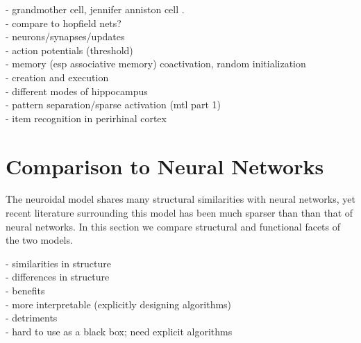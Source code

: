 \documentclass[letterpaper, 12pt]{article}
\begin{document}
- grandmother cell,  jennifer anniston cell \cite{quiroga_invariant_2005}.\\
- compare to hopfield nets?\\
- neurons/synapses/updates\\
- action potentials (threshold)\\
- memory (esp associative memory) coactivation, random initialization\\
- creation and execution\\
	- different modes of hippocampus\\

- pattern separation/sparse activation (mtl part 1)\\
- item recognition in perirhinal cortex %

\section{Comparison to Neural Networks}
The neuroidal model shares many structural similarities with neural networks, yet recent literature surrounding this model has been much sparser than than that of neural networks. In this section we compare structural and functional facets of the two models.

- similarities in structure\\
- differences in structure\\
- benefits\\
	- more interpretable (explicitly designing algorithms)\\
- detriments\\
	- hard to use as a black box; need explicit algorithms\\
\end{document}
